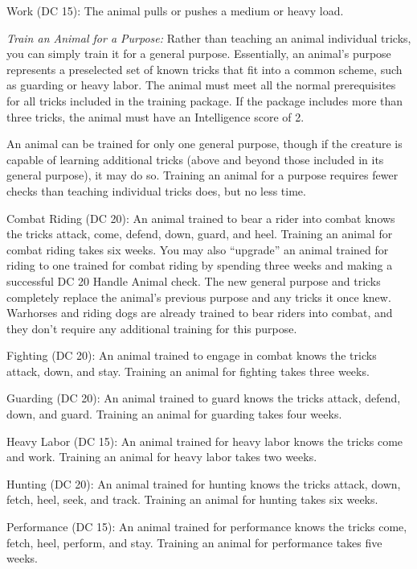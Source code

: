 \documentclass{article}
\begin{document}
Work (DC 15): The animal pulls or pushes a medium or heavy load.

\vspace{12pt}
\textit{Train an Animal for a Purpose: }Rather than teaching an animal individual 
tricks, you can simply train it for a general purpose. Essentially, an animal's 
purpose represents a preselected set of known tricks that fit into a common scheme, 
such as guarding or heavy labor. The animal must meet all the normal prerequisites 
for all tricks included in the training package. If the package includes more than 
three tricks, the animal must have an Intelligence score of 2.

An animal can be trained for only one general purpose, though if the creature is 
capable of learning additional tricks (above and beyond those included in its general 
purpose), it may do so. Training an animal for a purpose requires fewer checks 
than teaching individual tricks does, but no less time. 

Combat Riding (DC 20): An animal trained to bear a rider into combat knows the 
tricks attack, come, defend, down, guard, and heel. Training an animal for combat 
riding takes six weeks. You may also ``upgrade'' an animal trained for riding to 
one trained for combat riding by spending three weeks and making a successful DC 
20 Handle Animal check. The new general purpose and tricks completely replace the 
animal's previous purpose and any tricks it once knew. Warhorses and riding dogs 
are already trained to bear riders into combat, and they don't require any additional 
training for this purpose.

Fighting (DC 20): An animal trained to engage in combat knows the tricks attack, 
down, and stay. Training an animal for fighting takes three weeks.

Guarding (DC 20): An animal trained to guard knows the tricks attack, defend, down, 
and guard. Training an animal for guarding takes four weeks.

Heavy Labor (DC 15): An animal trained for heavy labor knows the tricks come and 
work. Training an animal for heavy labor takes two weeks.

Hunting (DC 20): An animal trained for hunting knows the tricks attack, down, fetch, 
heel, seek, and track. Training an animal for hunting takes six weeks.

Performance (DC 15): An animal trained for performance knows the tricks come, fetch, 
heel, perform, and stay. Training an animal for performance takes five weeks.
\end{document}
